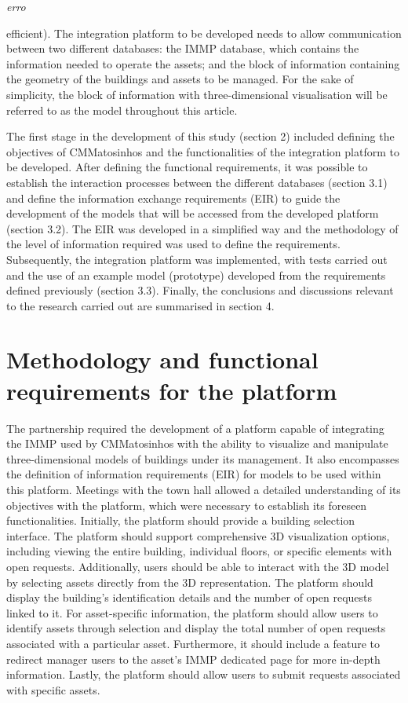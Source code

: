 \documentclass[a4paper, 10pt, twocolumn, twoside]{article}
\begin{document}
\emph{erro}

efficient). The integration platform to be developed needs to allow communication between two different databases: the IMMP database, which contains the information needed to operate the assets; and the block of information containing the geometry of the buildings and assets to be managed. For the sake of simplicity, the block of information with three-dimensional visualisation will be referred to as the model throughout this article.

The first stage in the development of this study (section 2) included defining the objectives of CMMatosinhos and the functionalities of the integration platform to be developed. After defining the functional requirements, it was possible to establish the interaction processes between the different databases (section 3.1) and define the information exchange requirements (EIR) to guide the development of the models that will be accessed from the developed platform (section 3.2). The EIR was developed in a simplified way and the methodology of the level of information required \cite{17412-1} was used to define the requirements. Subsequently, the integration platform was implemented, with tests carried out and the use of an example model (prototype) developed from the requirements defined previously (section 3.3). Finally, the conclusions and discussions relevant to the research carried out are summarised in section 4.

\section{Methodology and functional requirements for the platform}
\label{sec:methodology}

The partnership required the development of a platform capable of integrating the IMMP used by CMMatosinhos with the ability to visualize and manipulate three-dimensional models of buildings under its management. It also encompasses the definition of information requirements (EIR) for models to be used within this platform. Meetings with the town hall allowed a detailed understanding of its objectives with the platform, which were necessary to establish its foreseen functionalities. Initially, the platform should provide a building selection interface. The platform should support comprehensive 3D visualization options, including viewing the entire building, individual floors, or specific elements with open requests. Additionally, users should be able to interact with the 3D model by selecting assets directly from the 3D representation. The platform should display the building's identification details and the number of open requests linked to it. For asset-specific information, the platform should allow users to identify assets through selection and display the total number of open requests associated with a particular asset. Furthermore, it should include a feature to redirect manager users to the asset's IMMP dedicated page for more in-depth information. Lastly, the platform should allow users to submit requests associated with specific assets.
\end{document}

